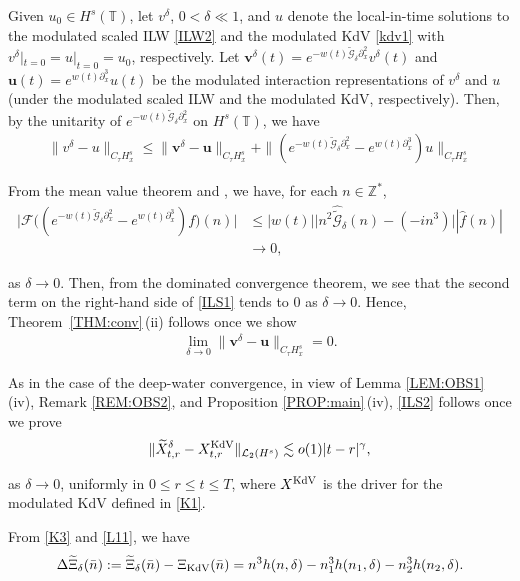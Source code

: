 \documentclass[letterpaper, 11pt,  reqno]{amsart}
\newcommand{\1}{\hspace{0.5mm}\text{I}\hspace{0.5mm}}
\newcommand{\noi}{\noindent}
\newcommand{\Z}{\mathbb{Z}}
\newcommand{\T}{\mathbb{T}}
\newcommand{\F}{\mathcal{F}}
\newcommand{\dl}{\delta}
\newcommand{\Dl}{\Delta}
\newcommand{\g}{\gamma}
\newcommand{\ft}{\widehat}
\newcommand{\wt}{\widetilde}
\newcommand{\dx}{\partial_x}
\newcommand{\Gd}{\wt{\mathcal{G}}_\dl}
\newcommand{\les}{\lesssim}
\newcommand{\cL}{\mathcal{L}}
\newcommand{\uu}{\mathbf{u}}
\newcommand{\vv}{\mathbf{v}}
\newcommand{\KDV}{\text{\rm KdV} }
\newcommand{\too}{\longrightarrow}
\numberwithin{equation}{section}
\numberwithin{theorem}{section}
\begin{document}
Given $u_0 \in H^s (\T)$,
let $v^\dl$, $0<   \dl \ll 1$,  and $u$ denote the local-in-time solutions
to the modulated scaled ILW \eqref{ILW2}
and the modulated KdV \eqref{kdv1}
with $v^\dl|_{t = 0} = u|_{t = 0} = u_0$, respectively.
Let 
$\vv^\dl(t) = e^{- w(t) \Gd \dx^2} v^\dl(t)$
and 
 $\uu(t) = e^{ w(t) \dx^3} u(t)$
be the modulated interaction representations
of $v^\dl$ and $u$ (under the modulated scaled ILW and the modulated KdV, respectively).
Then, by the unitarity of $e^{- w(t) \Gd \dx^2}$ on $H^s(\T)$, we have
\begin{align}
\| v^\dl - u\|_{C_\tau H^s_x}
\le \| \vv^\dl - \uu\|_{C_\tau H^s_x}
+ \| ( e^{ - w(t) \Gd \dx^2} -  e^{ w(t)  \dx^3}) u \|_{C_\tau H^s_x}
\label{ILS1}
\end{align}


\noi
From the mean value theorem and \cite[Lemma 2.3]{LOZ}, we have,
for each $n \in \Z^*$, 
\begin{align*}
\big| \F\big( (e^{ - w(t) \Gd \dx^2} -  e^{  w(t)  \dx^3}) f \big)(n)\big|
& \le
 |w(t)|\big| n^2 \ft \Gd(n) - (-i n^3) \big|
|\ft f (n)|\\
& \too0,
\end{align*}



\noi
as $\dl \to 0$.
Then, from the dominated convergence theorem, 
we see that the second term on the right-hand side
of \eqref{ILS1} tends to $0$ 
as $\dl \to 0$.
Hence, 
Theorem~\ref{THM:conv}\,(ii)
follows once we show
\begin{align}
\lim_{\dl \to 0} \| \vv^\dl - \uu\|_{C_\tau H^s_x} = 0.
\label{ILS2}
\end{align}







As in  the case of the deep-water convergence, 
in view of Lemma \ref{LEM:OBS1}\,(iv), Remark \ref{REM:OBS2}, and 
Proposition \ref{PROP:main}\,(iv),
\eqref{ILS2} follows once we  prove
\begin{align}
\|\wt X^{\dl}_{t,r} - X^{\KDV}_{t,r}\|_{\cL_2(H^s)}
\les 
o(1)|t-r|^{\g},
\label{L11a}
\end{align}

\noi
as $\dl\to 0$, 
uniformly in  $0 \le r \le  t \le T$, 
where $X^{\KDV}$
is  the driver for the modulated KdV defined  in \eqref{K1}.







From  \eqref{K3} and \eqref{L11},  we have
\begin{align}
\Dl \wt \Xi_\dl (\bar n): = \wt \Xi_\dl (\bar n) - \Xi_\KDV (\bar n)
 =
n^3 h(n,\dl)  - n_1^3 h(n_1,\dl)   - n_2^3 h(n_2,\dl) .
\label{L11b}
\end{align}
\end{document}
